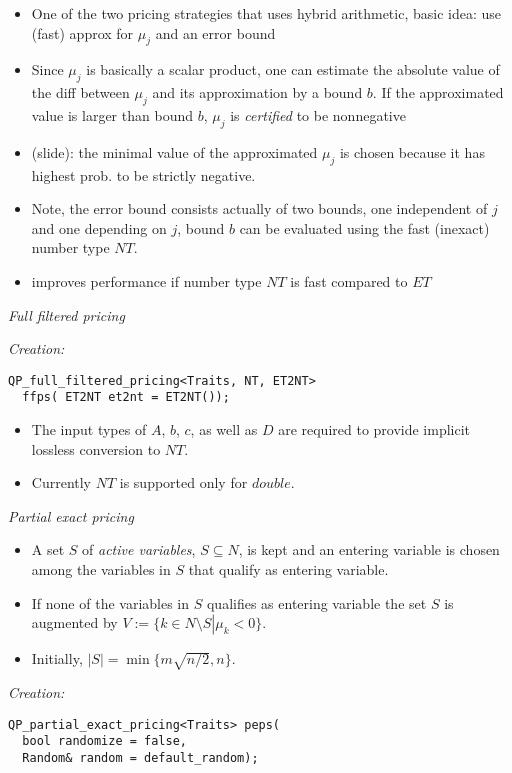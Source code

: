 \documentclass{slides}
\begin{document}
\begin{note}
\begin{itemize}
\item One of the two pricing strategies that uses hybrid arithmetic,
basic idea: use (fast) approx for $\mu_{j}$ and an error bound
\item Since $\mu_{j}$ is basically a scalar product, one can estimate the 
absolute value of the diff between $\mu_{j}$ and its approximation by a bound
$b$. If the approximated value is larger than bound $b$, $\mu_{j}$ is
\emph{certified} to be nonnegative
\item (slide): the minimal value of the approximated $\mu_{j}$ is chosen because
it has highest prob. to be strictly negative.
\item Note, the error bound consists actually of two bounds, one
independent of $j$ and one depending on $j$, bound $b$ can be evaluated
using the fast (inexact) number type $NT$.
\item improves performance if number type $NT$ is fast compared to $ET$
\end{itemize}
\end{note}


\begin{slide}
\emph{Full filtered pricing}

\emph{Creation:}
\begin{verbatim}
QP_full_filtered_pricing<Traits, NT, ET2NT>
  ffps( ET2NT et2nt = ET2NT());
\end{verbatim}
\end{slide}

\begin{note}
\begin{itemize}
\item The input types of $A$, $b$, $c$, as well as $D$ are required to provide
implicit lossless conversion to $NT$.
\item Currently $NT$ is supported only for $double$.
\end{itemize}
\end{note}

\begin{slide}
\emph{Partial exact pricing}

\begin{itemize}
\item A set $S$ of \emph{active variables}, $S \subseteq N$, is kept
and an entering variable is chosen among the variables in $S$ that
qualify as entering variable.

\item If none of the variables in $S$ qualifies as entering variable
the set $S$ is augmented by
$V:=\{k \in N \setminus S \left|\right. \mu_{k} < 0\}$.

\item Initially, $\left|S\right|=\min\{m\sqrt{n/2}, n\}$.
\end{itemize}


\emph{Creation:}
\begin{verbatim}
QP_partial_exact_pricing<Traits> peps(
  bool randomize = false, 
  Random& random = default_random);
\end{verbatim}
\end{slide}
\end{document}
